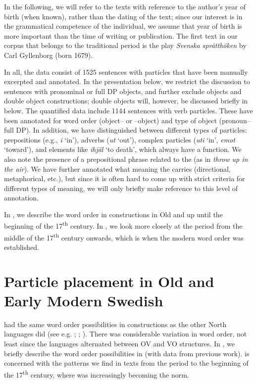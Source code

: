 \documentclass[output=paper]{langscibook}
\begin{document}
In the following, we will refer to the texts with reference to the author’s year of birth (when known), rather than the dating of the text; since our interest is in the grammatical competence of the individual, we assume that year of birth is more important than the time of writing or publication. The first text in our corpus that belongs to the traditional  period is the play \textit{Svenska sprätthöken} by Carl Gyllenborg (born 1679). 



In all, the data consist of 1525 sentences with particles that have been manually excerpted and annotated. In the presentation below, we restrict the discussion to sentences with pronominal or full DP objects, and further exclude  objects and double object constructions; double objects will, however, be discussed briefly in  below. The quantified data include 1144 sentences with verb particles. These have been annotated for word order (object– or –object) and type of object (pronoun–full DP). In addition, we have distinguished between different types of particles: prepositions (e.g., \textit{i} ‘in’), adverbs (\textit{ut} ‘out’), complex particles (\textit{uti} ‘in’, \textit{emot} ‘toward’), and elements like \textit{ihjäl} ‘to death’, which always have a  function. We also note the presence of a prepositional phrase related to the  (as in \textit{throw up in the air}). We have further annotated what meaning the  carries (directional, metaphorical, etc.), but since it is often hard to come up with strict criteria for different types of meaning, we will only briefly make reference to this level of annotation.



In , we describe the word order in  constructions in Old and  up until the beginning of the 17\textsuperscript{th} century. In , we look more closely at the period from the middle of the 17\textsuperscript{th} century onwards, which is when the modern word order was established.


\section{Particle placement in Old and Early Modern Swedish}\label{sec:lalu:4}


 had the same word order possibilities in  constructions as the other North  languages did (see e.g. \citealt{Ljunggren1932}; \citealt{Diderichsen1941}; \citealt{Hroarsdottir2008}). There was considerable variation in word order, not least since the languages alternated between OV and VO structures. In , we briefly describe the word order possibilities in  (with data from previous work).  is concerned with the patterns we find in texts from the  period to the beginning of the 17\textsuperscript{th} century, where  was increasingly becoming the norm.
\end{document}
